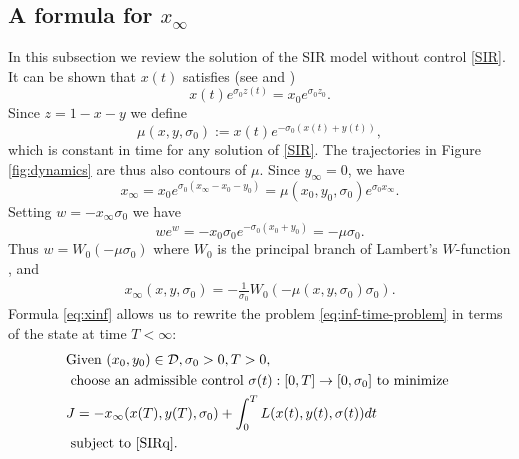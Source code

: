 \documentclass[english,12pt,letter]{article}
\newcommand{\Rnot}{\sigma_0}
\newcommand{\Sinf}{x_\infty}
\newcommand{\dom}{{\mathcal D}}
\begin{document}
\subsection{A formula for $\Sinf$}
In this subsection we review the solution of the SIR model without
control \eqref{SIR}.
It can be shown that $x(t)$ satisfies (see \cite{harko2014exact,pakes2015lambert} and
\cite[pp.707-708]{kermack1927contribution})
$$
    x(t)e^{\Rnot z(t)} = x_0 e^{\Rnot z_0}.
$$
Since $z=1-x-y$ we define
$$
   \mu(x,y,\Rnot) := x(t) e^{-\Rnot(x(t)+y(t))},
$$
which is constant in time for any solution of \eqref{SIR}.
The trajectories in Figure \ref{fig:dynamics} are thus also contours of $\mu$.
Since $y_\infty=0$, we have
$$
    x_\infty = x_0 e^{\Rnot(x_\infty-x_0-y_0)} = \mu(x_0,y_0,\Rnot) e^{\Rnot x_\infty}.
$$
Setting $w=-x_\infty \Rnot$ we have
$$
    we^w = -x_0 \Rnot e^{-\Rnot(x_0+y_0)} = -\mu \Rnot.
$$
Thus $w = W_0(-\mu\Rnot)$ where $W_0$ is the principal branch of Lambert's $W$-function \cite{pakes2015lambert},
and
\begin{align} \label{eq:xinf}
    x_\infty(x,y,\sigma_0) = -\frac{1}{\Rnot}W_0(-\mu(x,y,\sigma_0) \Rnot).
\end{align}
Formula \eqref{eq:xinf} allows us to rewrite the problem \eqref{eq:inf-time-problem} in
terms of the state at time $T<\infty$:
\begin{align} \label{eq:basic-problem}
\begin{aligned}
& \text{Given } (x_0, y_0) \in \dom, \sigma_0>0, T>0,  \\
& \text{ choose an admissible control } \sigma(t): [0,T] \to [0,\Rnot] \text{ to minimize }  \\
&     J = -x_\infty(x(T),y(T),\sigma_0) + \int_0^T L(x(t),y(t),\sigma(t)) dt \\
& \text{ subject to } \eqref{SIRq}.
\end{aligned}
\end{align}
\end{document}
